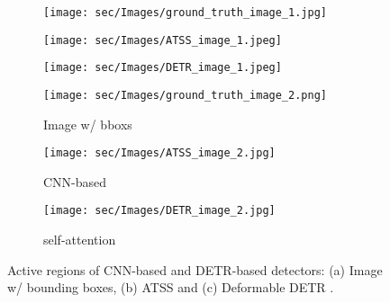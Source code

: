 \begin{figure}[t]
\begin{center}
    \begin{subfigure}[b]{0.31\linewidth}
    \texttt{[image: sec/Images/ground\_truth\_image\_1.jpg]}
    \end{subfigure}
    \begin{subfigure}[b]{0.31\linewidth}
    \texttt{[image: sec/Images/ATSS\_image\_1.jpeg]}
    \end{subfigure}
    \begin{subfigure}[b]{0.31\linewidth}
    \texttt{[image: sec/Images/DETR\_image\_1.jpeg]}
    \end{subfigure}

    \begin{subfigure}[b]{0.31\linewidth}
        \texttt{[image: sec/Images/ground\_truth\_image\_2.png]}
        \caption{Image w/ bboxs}\label{fig:ori}
    \end{subfigure}
    \begin{subfigure}[b]{0.31\linewidth}
        \texttt{[image: sec/Images/ATSS\_image\_2.jpg]}
        \caption{CNN-based}\label{fig:atss}
    \end{subfigure}
    \begin{subfigure}[b]{0.31\linewidth}
        \texttt{[image: sec/Images/DETR\_image\_2.jpg]}
        \caption{self-attention}\label{fig:detr}
    \end{subfigure}
\end{center}
\caption{
Active regions of CNN-based and DETR-based detectors: (a) Image w/ bounding boxes, (b) ATSS \cite{zhang2020bridging} and (c) Deformable DETR \cite{zhu2020deformable}.}
\label{fig:activate region}
\end{figure}